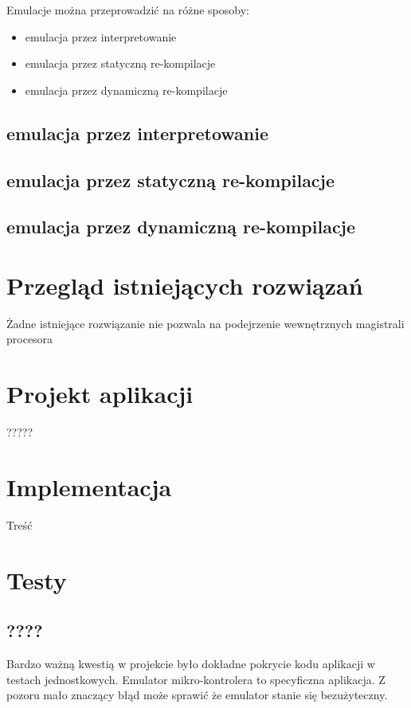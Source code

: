 \documentclass{article}
\begin{document}
	Emulacje można przeprowadzić na różne sposoby:
	\begin{itemize}  
		\item emulacja przez interpretowanie
		\item emulacja przez statyczną re-kompilacje
		\item emulacja przez dynamiczną re-kompilacje
	\end{itemize} \cite{fms_komkon_org_howto}	
	
	\subsection{emulacja przez interpretowanie}
	\subsection{emulacja przez statyczną re-kompilacje}
	\subsection{emulacja przez dynamiczną re-kompilacje}
	
	\section{Przegląd istniejących rozwiązań}
	Żadne istniejące rozwiązanie nie pozwala na podejrzenie wewnętrznych magistrali procesora
	
	\section{Projekt aplikacji}
	?????
	
	\section{Implementacja}
	Treść
	
	\section{Testy}
		
	\subsection{????}
	Bardzo ważną kwestią w projekcie było dokładne pokrycie kodu aplikacji w testach jednostkowych. Emulator mikro-kontrolera to specyficzna aplikacja. Z pozoru mało znaczący błąd może sprawić że emulator stanie się bezużyteczny. 
	
\end{document}
